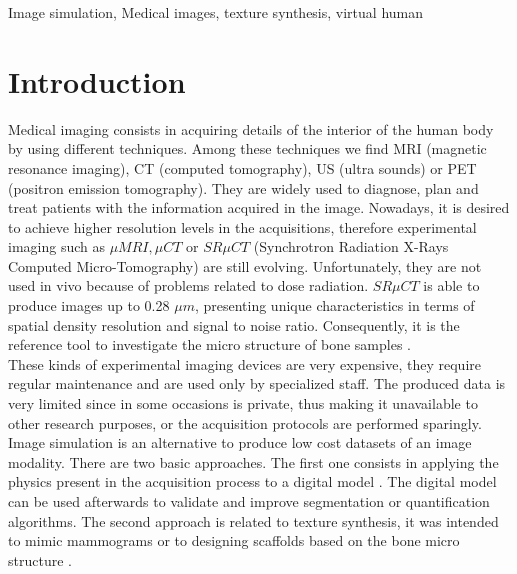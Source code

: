 \documentclass[10pt, conference]{IEEEtran}
\begin{document}
{\begin{abstract}
\end{abstract}
%
\begin{IEEEkeywords}
Image simulation, Medical images, texture synthesis, virtual human
\end{IEEEkeywords}


\IEEEpeerreviewmaketitle

%
\section{Introduction}
\label{sec:intro}
%
Medical imaging consists in acquiring details of the interior of the human body by using different techniques. 
Among these techniques we find MRI (magnetic resonance imaging), CT (computed tomography),
US (ultra sounds) or PET (positron emission tomography). They are widely used to diagnose, plan and treat patients with the information acquired in the image.
Nowadays, it is desired to achieve higher resolution levels in the acquisitions,
therefore experimental imaging such as $\mu{MRI}, \mu{CT}$ or $SR \mu{CT}$ (Synchrotron Radiation X-Rays Computed Micro-Tomography) 
are still evolving. Unfortunately, they are not used in vivo because of problems related to dose radiation.
$SR \mu{CT}$ is able to produce images up to 0.28 $\mu{m}$, presenting
unique characteristics in terms of spatial density resolution and signal to noise ratio.
Consequently, it is the reference tool to investigate the micro structure of bone samples \cite{revol2002}.
\\
These kinds of experimental imaging devices are very expensive, they require regular maintenance and are used only by specialized staff. The produced data is very limited since in some occasions is private, thus making it unavailable to other research purposes, or the acquisition protocols are performed sparingly. Image simulation is an alternative to produce low cost datasets of an image modality. 
There are two basic approaches. The first one consists in 
applying the physics present in the acquisition process to a digital model \cite{CHAR-09}.
The digital model can be used afterwards to validate and improve segmentation or quantification algorithms.
The second approach is related to texture synthesis, it was intended to mimic mammograms \cite{Castella:08} or
to designing scaffolds based on the bone micro structure \cite{DBLP:conf/smi/HoldsteinFPB09}. %
}
\end{document}
